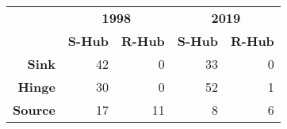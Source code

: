 \begin{tabular}{rrrrr}
\toprule&\multicolumn{2}{c}{\textbf{1998}}&\multicolumn{2}{c}{\textbf{2019}}\\
        &   \textbf{S-Hub} &   \textbf{R-Hub} &   \textbf{S-Hub} &   \textbf{R-Hub} \\
\midrule
   \textbf{Sink} &           42 &            0 &           33 &            0 \\
  \textbf{Hinge} &           30 &            0 &           52 &            1 \\
 \textbf{Source} &           17 &           11 &            8 &            6 \\
\bottomrule
\end{tabular}